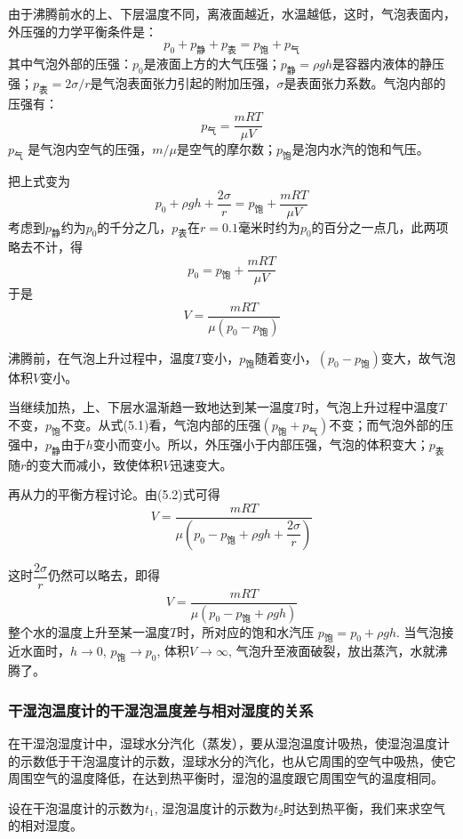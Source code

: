 由于沸腾前水的上、下层温度不同，离液面越近，水温越低，这时，气泡表面内，外压强的力学平衡条件是：
\begin{equation}
  p_0+p_{\text{静}}+p_{\text{表}}=p_{\text{饱}}+p_{\text{气}}
\end{equation}
其中气泡外部的压强：$p_0$是液面上方的大气压强；$p_{\text{静}}=\rho gh$是容器内液体的静压强；$p_{\text{表}}=2\sigma/r$是气泡表面张力引起的附加压强，$\sigma$是表面张力系数。气泡内部的压强有：
\[p_{\text{气}}=\frac{mRT}{\mu V}\]
$p_{\text{气}}$
是气泡内空气的压强，$m/\mu$是空气的摩尔数；$p_{\text{饱}}$是泡内水汽的饱和气压。

把上式变为
\begin{equation}
  p_0+\rho gh+\frac{2\sigma}{r}=p_{\text{饱}}+\frac{mRT}{\mu V}
\end{equation}
考虑到$p_{\text{静}}$约为$p_0$的千分之几，$p_{\text{表}}$在$r=0. 1$毫米时约为$p_0$的百分之一点几，此两项略去不计，得
\[p_0=p_{\text{饱}}+\frac{mRT}{\mu V}\]
于是
\[V=\frac{mRT}{\mu (p_0-p_{\text{饱}})}\]

沸腾前，在气泡上升过程中，温度$T$变小，$p_{\text{饱}}$随着变小，$(p_0-p_{\text{饱}})$变大，故气泡体积$V$变小。

当继续加热，上、下层水温渐趋一致地达到某一温度$T$时，气泡上升过程中温度$T$不变，$p_{\text{饱}}$不变。从式(5.1)看，气泡内部的压强$(p_{\text{饱}}+p_{\text{气}})$不变；而气泡外部的压强中，$p_{\text{静}}$由于$h$变小而变小。所以，外压强小于内部压强，气泡的体积变大；$p_{\text{表}}$随$r$的变大而减小，致使体积$V$迅速变大。

再从力的平衡方程讨论。由(5.2)式可得
\[V=\frac{mRT}{\mu\left(p_0-p_{\text{饱}}+\rho gh+\dfrac{2\sigma}{r}\right)}\]

这时$\dfrac{2\sigma}{r}$仍然可以略去，即得
\[V=\frac{mRT}{\mu(p_0-p_{\text{饱}}+\rho gh)}\]
整个水的温度上升至某一温度$T$时，所对应的饱和水汽压
$p_{\text{饱}}=p_0+\rho gh$. 当气泡接近水面时，$h\to 0$, $p_{\text{饱}}\to p_0$, 体积$V\to \infty$, 气泡升至液面破裂，放出蒸汽，水就沸腾了。

\subsubsection{干湿泡温度计的干湿泡温度差与相对湿度的关系}

在干湿泡湿度计中，湿球水分汽化（蒸发），要从湿泡温度计吸热，使湿泡温度计的示数低于干泡温度计的示数，湿球水分的汽化，也从它周围的空气中吸热，使它周围空气的温度降低，在达到热平衡时，湿泡的温度跟它周围空气的温度相同。

设在干泡温度计的示数为$t_1$, 湿泡温度计的示数为$t_2$时达到热平衡，我们来求空气的相对湿度。

